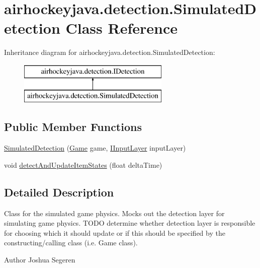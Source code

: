 \hypertarget{classairhockeyjava_1_1detection_1_1_simulated_detection}{}\section{airhockeyjava.\+detection.\+Simulated\+Detection Class Reference}
\label{classairhockeyjava_1_1detection_1_1_simulated_detection}
Inheritance diagram for airhockeyjava.\+detection.\+Simulated\+Detection\+:\begin{figure}[H]
\begin{center}
\leavevmode
\includegraphics[height=2.000000cm]{classairhockeyjava_1_1detection_1_1_simulated_detection}
\end{center}
\end{figure}
\subsection*{Public Member Functions}
\begin{DoxyCompactItemize}
\item 
\hyperlink{classairhockeyjava_1_1detection_1_1_simulated_detection_a08f6ed8313042748b96b8dd52a95ae07}{Simulated\+Detection} (\hyperlink{classairhockeyjava_1_1game_1_1_game}{Game} game, \hyperlink{interfaceairhockeyjava_1_1input_1_1_i_input_layer}{I\+Input\+Layer} input\+Layer)
\item 
void \hyperlink{classairhockeyjava_1_1detection_1_1_simulated_detection_a7b0b441f9392e52f7f60bad8b60587cc}{detect\+And\+Update\+Item\+States} (float delta\+Time)
\end{DoxyCompactItemize}


\subsection{Detailed Description}
Class for the simulated game physics. Mocks out the detection layer for simulating game physics. T\+O\+D\+O determine whether detection layer is responsible for choosing which it should update or if this should be specified by the constructing/calling class (i.\+e. Game class).

\begin{DoxyAuthor}{Author}
Joshua Segeren 
\end{DoxyAuthor}


